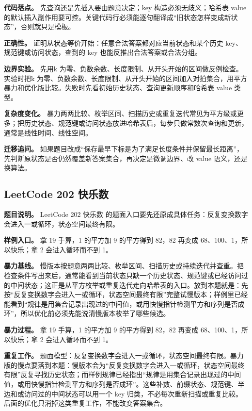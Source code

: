 \textbf{代码落点。} 先查询还是先插入要由题意决定；key 构造必须无歧义；哈希表 value 的默认插入副作用要可控。关键代码行必须能逐句翻译成“旧状态怎样变成新状态”，否则就只是模板。

\textbf{正确性。} 证明从状态等价开始：任意合法答案都对应当前状态和某个历史 key、规范键或访问状态，查到的 key 也能反推出合法答案或合法分组。

\textbf{边界实验。} 先用k 为零、负数余数、长度限制、从开头开始的区间做反例检查。实验时把k 为零、负数余数、长度限制、从开头开始的区间加入对拍集合，用平方暴力和优化版比较。失败时先看初始历史状态、查询更新顺序和哈希表 value 类型。

\textbf{复杂度变化。} 暴力两两比较、枚举区间、扫描历史或重复迭代常见为平方级或更多；把历史状态、规范键或访问状态放进哈希表后，每步只做常数次查询和更新，通常是线性时间、线性空间。

\textbf{迁移追问。} 如果题目改成“保存最早下标是为了满足长度条件并保留最长距离”，先判断原状态是否仍然覆盖新答案集合，再决定是微调边界、改 value 语义，还是换算法。

\subsection{LeetCode 202 快乐数}

\textbf{题目说明。} LeetCode 202 快乐数 的题面入口要先还原成具体任务：反复变换数字会进入一或循环，状态空间最终有限。

\textbf{样例入口。} 拿 19 手算，1 的平方加 9 的平方得到 82，82 再变成 68、100、1，所以快乐；拿 2 会进入循环而不到 1。

\textbf{暴力基线。} 慢版本按题意两两比较、枚举区间、扫描历史或持续迭代并查重。把检查条件写出来后，通常能看到当前状态只缺一个历史状态、规范键或已经访问过的中间状态；这正是从平方枚举或重复迭代走向哈希表的入口。放到本题就是：先按“反复变换数字会进入一或循环，状态空间最终有限”完整试慢版本；样例里已经能看到“规律是用集合记录出现过的中间值，或用快慢指针检测平方和序列是否成环”，所以优化前必须先能说清慢版本枚举了哪些候选。

\textbf{暴力过程。} 拿 19 手算，1 的平方加 9 的平方得到 82，82 再变成 68、100、1，所以快乐；拿 2 会进入循环而不到 1。

\textbf{重复工作。} 题面模型：反复变换数字会进入一或循环，状态空间最终有限。暴力版的慢点要落到本题：慢版本会为“反复变换数字会进入一或循环，状态空间最终有限”反复寻找历史状态；而样例规律已经指出“规律是用集合记录出现过的中间值，或用快慢指针检测平方和序列是否成环”。这些补数、前缀状态、规范键、半边和或访问过的中间状态可以用一个 key 归类，不必每次重新扫描或重复比较。后面的优化只消掉这类重复工作，不能改变答案集合。


